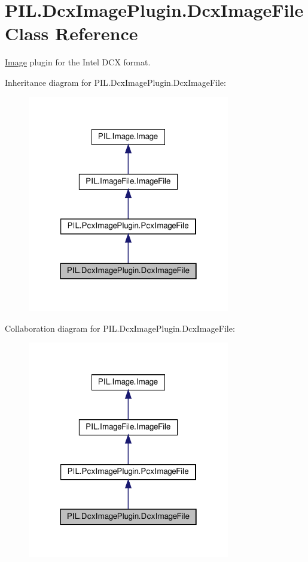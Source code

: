 \hypertarget{classPIL_1_1DcxImagePlugin_1_1DcxImageFile}{}\section{P\+I\+L.\+Dcx\+Image\+Plugin.\+Dcx\+Image\+File Class Reference}
\label{classPIL_1_1DcxImagePlugin_1_1DcxImageFile}


\hyperlink{namespacePIL_1_1Image}{Image} plugin for the Intel D\+CX format.  




Inheritance diagram for P\+I\+L.\+Dcx\+Image\+Plugin.\+Dcx\+Image\+File\+:
\nopagebreak
\begin{figure}[H]
\begin{center}
\leavevmode
\includegraphics[width=250pt]{classPIL_1_1DcxImagePlugin_1_1DcxImageFile__inherit__graph}
\end{center}
\end{figure}


Collaboration diagram for P\+I\+L.\+Dcx\+Image\+Plugin.\+Dcx\+Image\+File\+:
\nopagebreak
\begin{figure}[H]
\begin{center}
\leavevmode
\includegraphics[width=250pt]{classPIL_1_1DcxImagePlugin_1_1DcxImageFile__coll__graph}
\end{center}
\end{figure}
